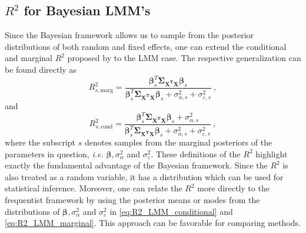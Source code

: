 \subsection{$R^2$ for Bayesian LMM's}
\label{sec:bayes_R2_LMM}
Since the Bayesian framework allows us to sample from the posterior distributions of both random and fixed effects, one can extend the conditional and marginal $R^2$ proposed by \citet{gelman2017rsquared} to the LMM case. 
The respective generalization can be found directly as
\begin{equation}
    \label{eq:R2_bayes_LMM_cond}
    R_{s, \text{marg}}^2 = \frac{\boldsymbol{\beta}_s^T \boldsymbol{\Sigma_{\mathbf{X^TX}}}\boldsymbol{\beta}_s}{\boldsymbol{\beta}_s^T \boldsymbol{\Sigma_{\mathbf{X^TX}}}\boldsymbol{\beta}_s + \sigma_{\alpha, s}^2 + \sigma_{\varepsilon, s}^2} \ ,
\end{equation} 
and
\begin{equation}
    \label{eq:R2_bayes_LMM_marg}
    R_{s, \text{cond}}^2 = \frac{\boldsymbol{\beta}_s^T \boldsymbol{\Sigma_{\mathbf{X^TX}}}\boldsymbol{\beta}_s + \sigma_{\alpha, s}^2}{\boldsymbol{\beta}_s^T \boldsymbol{\Sigma_{\mathbf{X^TX}}}\boldsymbol{\beta}_s + \sigma_{\alpha, s}^2 + \sigma_{\varepsilon, s}^2} \ ,
\end{equation}
where the subscript $s$ denotes samples from the marginal posteriors of the parameters in question, \textit{i.e.} $\boldsymbol{\beta}, \sigma_{\alpha}^2$ and $\sigma_{\varepsilon}^2$.
These definitions of the $R^2$ highlight exactly the fundamental advantage of the Bayesian framework. Since the $R^2$ is also treated as a random variable, it has a distribution which can be used for statistical inference. 
Moreover, one can relate the $R^2$ more directly to the frequentist framework by using the posterior means or modes from the distributions of $\boldsymbol{\beta}, \sigma_{\alpha}^2$ and $\sigma_{\varepsilon}^2$ in \eqref{eq:R2_LMM_conditional} and \eqref{eq:R2_LMM_marginal}. This approach can be favorable for comparing methods.

